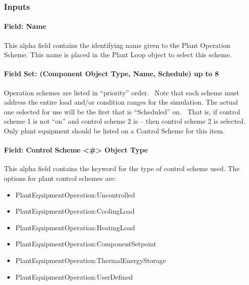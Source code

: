 \subsubsection{Inputs}\label{inputs-033}

\paragraph{Field: Name}\label{field-name-032}

This alpha field contains the identifying name given to the Plant Operation Scheme. This name is placed in the Plant Loop object to select this scheme.

\paragraph{Field Set: (Component Object Type, Name, Schedule) up to 8}\label{field-set-component-object-type-name-schedule-up-to-8}

Operation schemes are listed in ``priority'' order.~ Note that each scheme must address the entire load and/or condition ranges for the simulation. The actual one selected for use will be the first that is ``Scheduled'' on.~ That is, if control scheme 1 is not ``on'' and control scheme 2 is -- then control scheme 2 is selected. Only plant equipment should be listed on a Control Scheme for this item.

\paragraph{Field: Control Scheme \textless{}\#\textgreater{} Object Type}\label{field-control-scheme-object-type}

This alpha field contains the keyword for the type of control scheme used. The options for plant control schemes are:

\begin{itemize}
\item
  PlantEquipmentOperation:Uncontrolled
\item
  PlantEquipmentOperation:CoolingLoad
\item
  PlantEquipmentOperation:HeatingLoad
\item
  PlantEquipmentOperation:ComponentSetpoint
\item
  PlantEquipmentOperation:ThermalEnergyStorage
\item
  PlantEquipmentOperation:UserDefined
\end{itemize}

